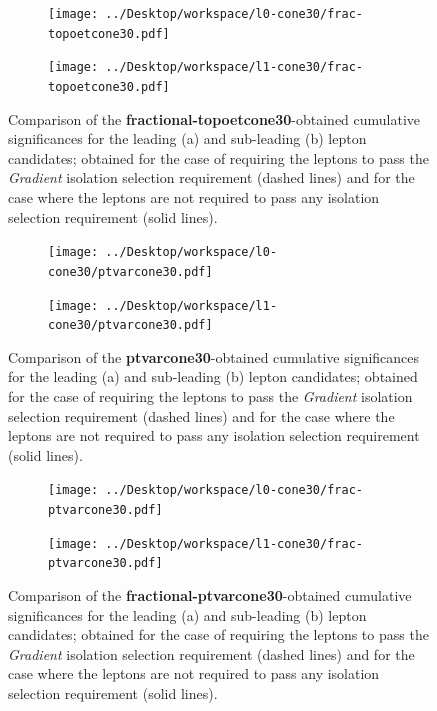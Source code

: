 \begin{figure}
\centering
\begin{subfigure}{.85\textwidth}
  \centering
  \texttt{[image: ../Desktop/workspace/l0-cone30/frac-topoetcone30.pdf]}
  \caption{}
  \label{leading_frac-topoetcone}
\end{subfigure}
\begin{subfigure}{.85\textwidth}
  \centering
  \texttt{[image: ../Desktop/workspace/l1-cone30/frac-topoetcone30.pdf]}
  \caption{}
  \label{subleading_frac-topoetcone}
\end{subfigure}
\caption{Comparison of the \textbf{fractional-topoetcone30}-obtained cumulative significances for the leading (a) and sub-leading (b) lepton candidates; obtained for the case of requiring the leptons to pass the \textit{Gradient} isolation selection requirement (dashed lines) and for the case where the leptons are not required to pass any isolation selection requirement (solid lines).}
\label{comp_frac-topoetcone}
\end{figure}
\begin{figure}
\centering
\begin{subfigure}{.85\textwidth}
  \centering
  \texttt{[image: ../Desktop/workspace/l0-cone30/ptvarcone30.pdf]}
  \caption{}
  \label{leading_ptvarcone}
\end{subfigure}
\begin{subfigure}{.85\textwidth}
  \centering
  \texttt{[image: ../Desktop/workspace/l1-cone30/ptvarcone30.pdf]}
  \caption{}
  \label{subleading_ptvarcone}
\end{subfigure}
\caption{Comparison of the \textbf{ptvarcone30}-obtained cumulative significances for the leading (a) and sub-leading (b) lepton candidates; obtained for the case of requiring the leptons to pass the \textit{Gradient} isolation selection requirement (dashed lines) and for the case where the leptons are not required to pass any isolation selection requirement (solid lines).}
\label{comp_ptvarcone}
\end{figure}
\begin{figure}
\centering
\begin{subfigure}{.85\textwidth}
  \centering
  \texttt{[image: ../Desktop/workspace/l0-cone30/frac-ptvarcone30.pdf]}
  \caption{}
  \label{leading_frac-ptvarcone}
\end{subfigure}
\begin{subfigure}{.85\textwidth}
  \centering
  \texttt{[image: ../Desktop/workspace/l1-cone30/frac-ptvarcone30.pdf]}
  \caption{}
  \label{subleading_frac-ptvarcone}
\end{subfigure}
\caption{Comparison of the \textbf{fractional-ptvarcone30}-obtained cumulative significances for the leading (a) and sub-leading (b) lepton candidates; obtained for the case of requiring the leptons to pass the \textit{Gradient} isolation selection requirement (dashed lines) and for the case where the leptons are not required to pass any isolation selection requirement (solid lines).}
\label{comp_frac-ptvarcone}
\end{figure}
